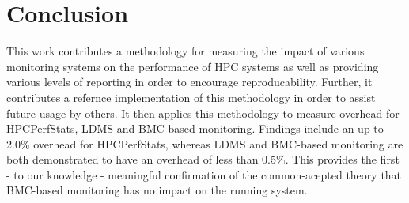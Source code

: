 \documentclass[conference]{IEEEtran}
\begin{document}
\section{Conclusion} \label{conclusion}

This work contributes a methodology for measuring the impact of various 
monitoring systems on the performance of HPC systems as well as providing 
various levels of reporting in order to encourage reproducability. Further, it 
contributes a refernce implementation of this methodology in order to assist 
future usage by others. It then 
applies this methodology to measure overhead for HPCPerfStats, LDMS and 
BMC-based monitoring. Findings include an up to 2.0\% overhead for HPCPerfStats, 
whereas LDMS and BMC-based monitoring are both demonstrated to have an overhead 
of less than 0.5\%. This provides the first - to our knowledge - meaningful 
confirmation of the common-acepted theory that BMC-based monitoring has no 
impact on the running system.

{}
\end{document}
